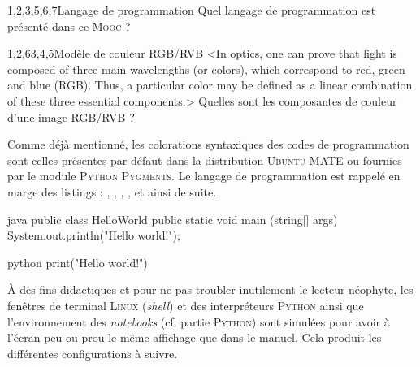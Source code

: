 \begin{quiz*}[title=Autoévaluation, points={1,5 points}]
\vspace{-\baselineskip}
	\begin{mcqdemo*}{4}{1,2,3,5,6,7}{Langage de programmation}
		Quel langage de programmation est présenté dans ce \textsc{Mooc} ?
	\end{mcqdemo*}
	\begin{mcqdemo}{1,2,6}{3,4,5}{Modèle de couleur RGB/RVB}%
	<In optics, one can prove that light is composed of three main wavelengths (or colors), which correspond to red, green and blue (RGB). Thus, a particular color may be defined as a linear combination of these three essential components.>
		Quelles sont les composantes de couleur d'une image RGB/RVB ?
	\end{mcqdemo}
\end{quiz*}

Comme déjà mentionné, les colorations syntaxiques des codes de programmation sont celles présentes par défaut dans la distribution \textsc{Ubuntu} MATE ou fournies par le module \textsc{Python} \textsc{Pygments}. Le langage de programmation est rappelé en marge des listings : \textcolor{firstcolor}{\xfaC}, \textcolor{firstcolor}{\xfaCplusplus}, \textcolor{firstcolor}{\xfaJavaBold}, \textcolor{firstcolor}{\faJs}, \textcolor{firstcolor}{\xfaPython} et ainsi de suite.

\begin{fullwidth}
\hfill
\begin{codebox}[width=0.45\linewidth, nobeforeafter]{java}
public class HelloWorld
{
	public static void main (string[] args)
	{
		System.out.println("Hello world!");
	}
}
\end{codebox}
\qquad\quad %
\begin{codebox}[width=0.265\linewidth, nobeforeafter]{python}
print("Hello world!")
\end{codebox}
\end{fullwidth}

À des fins didactiques et pour ne pas troubler inutilement le lecteur néophyte, les fenêtres de terminal \textsc{Linux} (\textit{shell}) et des interpréteurs \textsc{Python} ainsi que l'environnement des \textit{notebooks} (cf. partie \textsc{Python}) sont simulées pour avoir à l'écran peu ou prou le même affichage que dans le manuel. Cela produit les différentes configurations à suivre.

